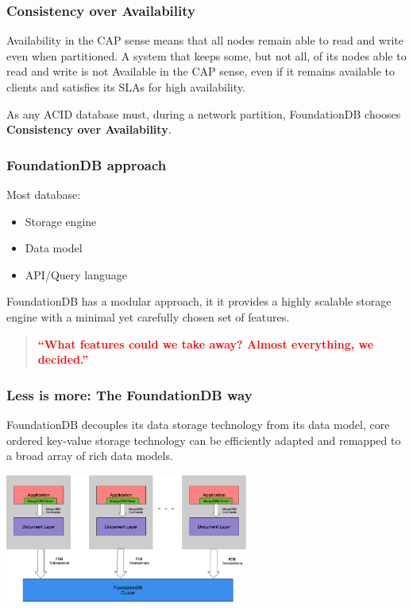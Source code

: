 
\begin{frame}
	\frametitle{Consistency over Availability}

 Availability in the CAP sense means that all nodes remain able to read and write even when partitioned. A system that keeps some, but not all, of its nodes able to read and write is not Available in the CAP sense, even if it remains available to clients and satisfies its SLAs for high availability.
\vspace{0.5cm}

As any ACID database must, during a network partition, FoundationDB chooses \textbf{Consistency over Availability}. 

\end{frame}


\begin{frame}
	\frametitle{FoundationDB approach}
Most database: 
    \begin{itemize}
        \item Storage engine
        \item Data model
        \item API/Query language
    \end{itemize}

FoundationDB has a modular approach, it it provides a highly scalable storage engine with a minimal yet carefully chosen set of features.

\vspace{0.5cm}
\begin{quote}
    \textbf{\textcolor{red}{``What features could we take away? Almost everything, we decided.''}}
\end{quote}
        
\end{frame}



\begin{frame}
	\frametitle{Less is more: The FoundationDB way}
FoundationDB decouples its data storage technology from its data model, core ordered key-value storage technology can be efficiently adapted and remapped to a broad array of rich data models.
\vspace{0.5cm}

\begin{center}
    \includegraphics[width=0.6\textwidth]{img/1-Introduction/sidecar-arch.png}
\end{center}

\end{frame}

